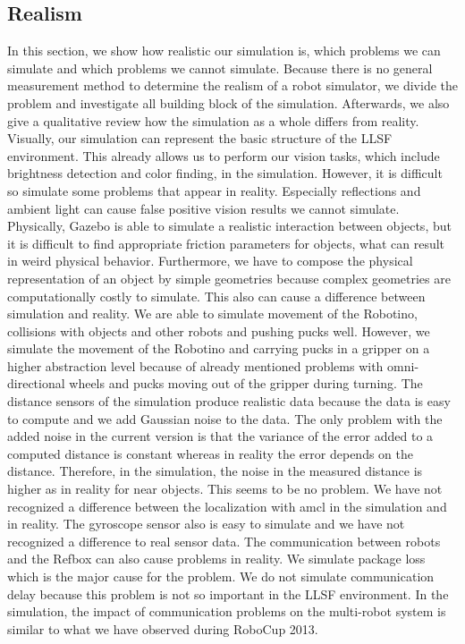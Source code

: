 \subsection{Realism}
In this section, we show how realistic our simulation is, which problems we can simulate and which problems we cannot simulate. Because there is no general measurement method to determine the realism of a robot simulator, we divide the problem and investigate all building block of the simulation. Afterwards, we also give a qualitative review how the simulation as a whole differs from reality.\\
Visually, our simulation can represent the basic structure of the LLSF environment. This already allows us to perform our vision tasks, which include brightness detection and color finding, in the simulation. However, it is difficult so simulate some problems that appear in reality. Especially reflections and ambient light can cause false positive vision results we cannot simulate. Physically, Gazebo is able to simulate a realistic interaction between objects, but it is difficult to find appropriate friction parameters for objects, what can result in weird physical behavior. Furthermore, we have to compose the physical representation of an object by simple geometries because complex geometries are computationally costly to simulate. This also can cause a difference between simulation and reality. We are able to simulate movement of the Robotino, collisions with objects and other robots and pushing pucks well. However, we simulate the movement of the Robotino and carrying pucks in a gripper on a higher abstraction level because of already mentioned problems with omni-directional wheels and pucks moving out of the gripper during turning. The distance sensors of the simulation produce realistic data because the data is easy to compute and we add Gaussian noise to the data. The only problem with the added noise in the current version is that the variance of the error added to a computed distance is constant whereas in reality the error depends on the distance. Therefore, in the simulation, the noise in the measured distance is higher as in reality for near objects. This seems to be no problem. We have not recognized a difference between the localization with amcl in the simulation and in reality. The gyroscope sensor also is easy to simulate and we have not recognized a difference to real sensor data. The communication between robots and the Refbox can also cause problems in reality. We simulate package loss which is the major cause for the problem. We do not simulate communication delay because this problem is not so important in the LLSF environment. In the simulation, the impact of communication problems on the multi-robot system is similar to what we have observed during RoboCup 2013.\\
